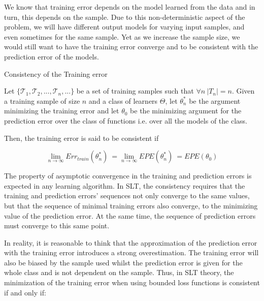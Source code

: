 We know that  training error depends on the model learned from the data and in turn, this depends on the sample. Due to this non-deterministic aspect of the problem, we will have different output  models for varying input samples, and even sometimes for the same sample. Yet as we increase the sample size, we would still want to have the training error converge and to be consistent with the prediction error of the models.



\begin{definition}{Consistency of the Training error}

Let $\{\mathcal {T}_1, \mathcal {T}_2, ..., \mathcal {T}_n, ...  \}$ be a set of training samples such that $\forall n \ |T_n|=n$. Given a training sample of size $n$ and a class of learners $\Theta$, let $\theta^{*}_n$ be the argument minimizing the training error and let $\theta_0$ be the minimizing argument for the prediction error over the class of functions i.e. over all the models of the class.

Then, the training error is said to be consistent if

\begin{equation}
\lim_{n\to\infty} Err_{train}(\theta^{*}_n) \  = \lim_{n\to\infty} EPE(\theta^{*}_n) \ =  EPE(\theta_0)
\end{equation}

\end{definition}

The property of asymptotic convergence in the training and prediction errors is expected in any learning algorithm. In SLT, the consistency requires that the training and prediction errors'  sequences not only converge to the same values, but that the sequence of minimal training errors also converge, to the minimizing value of the prediction error. At the same time, the sequence of prediction errors must converge to this same point.

In reality, it is reasonable to think that the approximation of the prediction error with the training error introduces a strong overestimation. The training error will also be biased by the sample used whilst the prediction error is given for the whole class and is not dependent on the sample. Thus, in SLT theory, the minimization of the training error when using bounded loss functions is consistent if and only if:


